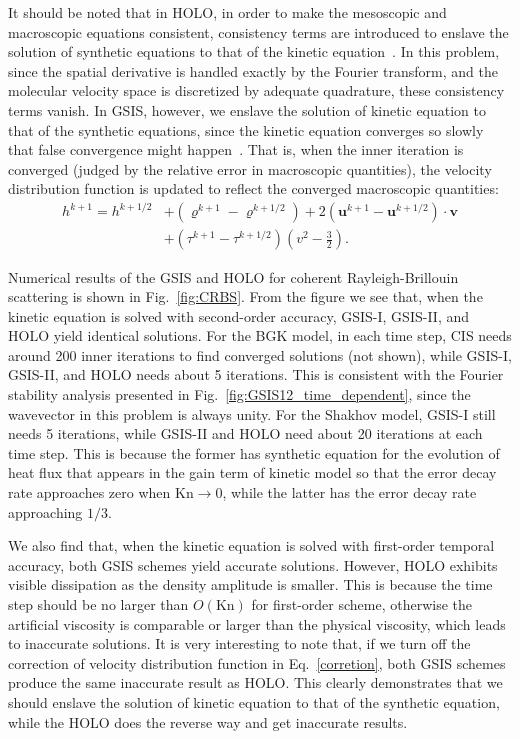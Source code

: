 \documentclass[onefignum,onetabnum]{siamart171218}
\begin{document}
It should be noted that in HOLO, in order to make the mesoscopic and macroscopic equations consistent, consistency terms are introduced to enslave the solution of synthetic equations to that of the kinetic equation~\cite{Taitano2014}. In this problem, since the spatial derivative is handled exactly by the Fourier transform, and the molecular velocity space is discretized by adequate quadrature, these consistency terms vanish. In GSIS, however, we enslave the solution of kinetic equation to that of the synthetic equations, since the kinetic equation converges so slowly that false convergence might happen~\cite{DSA2002,SuArXiv2019}. That is, when the inner iteration is converged (judged by the relative error in macroscopic quantities), the velocity distribution function is updated to reflect the converged macroscopic quantities:
\begin{equation}\label{corretion}
\begin{aligned}
h^{k+1}=h^{k+1/2}
&+ \left({\varrho}^{k+1}-\varrho^{k+1/2}\right)  +2\left({\bm{u}}^{k+1}-\bm{u}^{k+1/2}\right)\cdot\bm{v} \\
&+\left({\tau}^{k+1}-\tau^{k+1/2} \right) \left( v^2-\frac{3}{2} \right).
\end{aligned}
\end{equation}


Numerical results of the GSIS and HOLO for coherent Rayleigh-Brillouin scattering is shown in Fig.~\ref{fig:CRBS}. From the figure we see that, when the kinetic equation is solved with second-order accuracy, GSIS-I, GSIS-II, and HOLO yield identical solutions. For the BGK model, in each time step, CIS needs around 200 inner iterations to find converged solutions (not shown), while GSIS-I, GSIS-II, and HOLO needs about 5 iterations. This is consistent with the Fourier stability analysis presented in Fig.~\ref{fig:GSIS12_time_dependent}, since the wavevector in this problem is always unity. For the Shakhov model, GSIS-I still needs 5 iterations, while GSIS-II and HOLO need about 20 iterations at each time step. This is because the former has synthetic equation for the evolution of heat flux that appears in the gain term of kinetic model so that the error decay rate approaches zero when $\text{Kn}\rightarrow0$, while the latter has the error decay rate approaching $1/3$. 


We also find that, when the kinetic equation is solved with first-order temporal accuracy, both GSIS schemes yield accurate solutions. However, HOLO exhibits visible dissipation as the density amplitude is smaller. This is because the time step should be no larger than $O(\text{Kn})$ for first-order scheme, otherwise the artificial viscosity is comparable or larger than the physical viscosity, which leads to inaccurate solutions. It is very interesting to note that, if we turn off the correction of velocity distribution function in Eq.~\eqref{corretion}, both GSIS schemes produce the same  inaccurate result as HOLO. This clearly demonstrates that we should enslave the solution of kinetic equation to that of the synthetic equation, while the HOLO does the reverse way and get inaccurate results.
\end{document}
